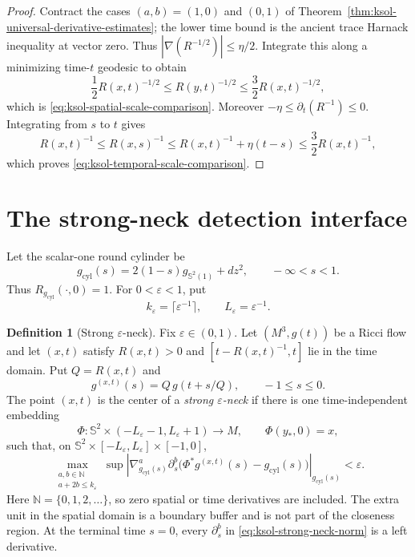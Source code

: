 \documentclass[10pt]{coll-l}
\newcommand{\Sph}{\mathbb{S}}
\theoremstyle{definition}
\newtheorem{definition}[theorem]{Definition}
\theoremstyle{remark}
\numberwithin{section}{chapter}
\numberwithin{equation}{chapter}
\begin{document}
\begin{proof}
Contract the cases $(a,b)=(1,0)$ and $(0,1)$ of
Theorem~\ref{thm:ksol-universal-derivative-estimates}; the lower time bound
is the ancient trace Harnack inequality at vector zero.  Thus
$|\nabla(R^{-1/2})|\leq\eta/2$.  Integrate this along a minimizing
time-$t$ geodesic to obtain
\[
 \frac12R(x,t)^{-1/2}\leq R(y,t)^{-1/2}
       \leq\frac32R(x,t)^{-1/2},
\]
which is \eqref{eq:ksol-spatial-scale-comparison}.  Moreover
$-\eta\leq\partial_t(R^{-1})\leq0$.  Integrating from $s$ to $t$ gives
\[
 R(x,t)^{-1}\leq R(x,s)^{-1}
 \leq R(x,t)^{-1}+\eta(t-s)
 \leq\frac32R(x,t)^{-1},
\]
which proves \eqref{eq:ksol-temporal-scale-comparison}.
\end{proof}

\section{The strong-neck detection interface}
\label{sec:ksol-neck-detection}

Let the scalar-one round cylinder be
\begin{equation}
 g_{\mathrm{cyl}}(s)=2(1-s)g_{\Sph^2(1)}+dz^2,
 \qquad -\infty<s<1.                                  \label{eq:ksol-normalized-cylinder}
\end{equation}
Thus $R_{g_{\mathrm{cyl}}}(\cdot,0)=1$.  For
$0<\varepsilon<1$, put
\begin{equation}
 k_\varepsilon=\lceil\varepsilon^{-1}\rceil,
 \qquad L_\varepsilon=\varepsilon^{-1}.               \label{eq:ksol-neck-parameters}
\end{equation}

\begin{definition}[Strong $\varepsilon$-neck]
\label{def:ksol-strong-neck}
Fix $\varepsilon\in(0,1)$.  Let $(M^3,g(t))$ be a Ricci flow and let
$(x,t)$ satisfy $R(x,t)>0$ and
$[t-R(x,t)^{-1},t]$ lie in the time domain.  Put $Q=R(x,t)$ and
\[
                       g^{(x,t)}(s)=Q\,g(t+s/Q),
                       \qquad -1\leq s\leq0.
\]
The point $(x,t)$ is the center of a \emph{strong $\varepsilon$-neck} if
there is one time-independent embedding
\begin{equation}
 \Phi:\Sph^2\times(-L_\varepsilon-1,L_\varepsilon+1)\longrightarrow M,
 \qquad \Phi(y_*,0)=x,                                 \label{eq:ksol-strong-neck-embedding}
\end{equation}
such that, on
$\Sph^2\times[-L_\varepsilon,L_\varepsilon]\times[-1,0]$,
\begin{equation}
 \max_{\substack{a,b\in\mathbb N\\a+2b\leq k_\varepsilon}}
 \sup\left|
 \nabla_{g_{\mathrm{cyl}}(s)}^a\partial_s^b
 \bigl(\Phi^*g^{(x,t)}(s)-g_{\mathrm{cyl}}(s)\bigr)
 \right|_{g_{\mathrm{cyl}}(s)}
 <\varepsilon.                                        \label{eq:ksol-strong-neck-norm}
\end{equation}
Here $\mathbb N=\{0,1,2,\ldots\}$, so zero spatial or time derivatives are
included.
The extra unit in the spatial domain is a boundary buffer and is not part
of the closeness region.  At the terminal time $s=0$, every
$\partial_s^b$ in \eqref{eq:ksol-strong-neck-norm} is a left derivative.
\end{definition}
\end{document}

